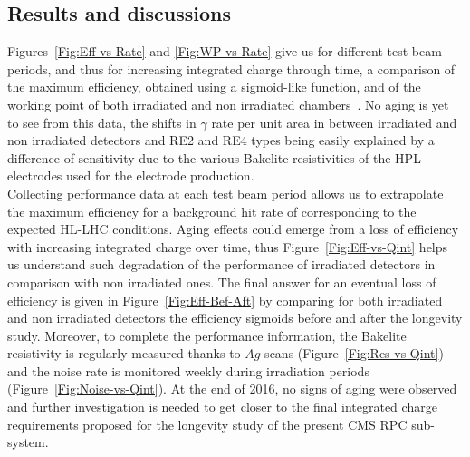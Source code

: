 	\subsection{Results and discussions}
	\label{chapt5:ssec:resultsGIFpp}
    
	Figures~\ref{Fig:Eff-vs-Rate} and \ref{Fig:WP-vs-Rate} give us for different test beam periods, and thus for increasing integrated charge through time, a comparison of the maximum efficiency, obtained using a sigmoid-like function, and of the working point of both irradiated and non irradiated chambers~\cite{ABBRESCIA2005}. No aging is yet to see from this data, the shifts in $\gamma$ rate per unit area  in between irradiated and non irradiated detectors and RE2 and RE4 types being easily explained by a difference of sensitivity due to the various Bakelite resistivities of the HPL electrodes used for the electrode production.\\
     Collecting performance data at each test beam period allows us to extrapolate the maximum efficiency for a background hit rate of  corresponding to the expected HL-LHC conditions. Aging effects could emerge from a loss of efficiency with increasing integrated charge over time, thus Figure~\ref{Fig:Eff-vs-Qint} helps us understand such degradation of the performance of irradiated detectors in comparison with non irradiated ones. The final answer for an eventual loss of efficiency is given in Figure~\ref{Fig:Eff-Bef-Aft} by comparing for both irradiated and non irradiated detectors the efficiency sigmoids before and after the longevity study. Moreover, to complete the performance information, the Bakelite resistivity is regularly measured thanks to $Ag$ scans (Figure~\ref{Fig:Res-vs-Qint}) and the noise rate is monitored weekly during irradiation periods (Figure~\ref{Fig:Noise-vs-Qint}). At the end of 2016, no signs of aging were observed and further investigation is needed to get closer to the final integrated charge requirements proposed for the longevity study of the present CMS RPC sub-system.\\
    
